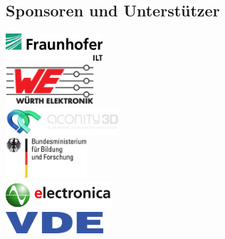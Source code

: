 \documentclass[a4paper,12pt,notumble]{leaflet}
\begin{document}
\noindent
\begin{minipage}[c][0.45\textheight][t]{\textwidth}
	\begin{center}
		\section{Sponsoren und Unterstützer}
		\vspace{1cm}
		\includegraphics[height= 1cm]{../Logos/ILT.png} \\ \vspace{0.3cm}
		\includegraphics[height= 1.5cm]{../Logos/Wuerth.png} \\ \vspace{0.3cm}
		\includegraphics[height= 1cm]{../Logos/aconity.png} \\ \vspace{0.3cm}
		\includegraphics[height= 1.5cm]{../Logos/BMBF.jpg} \\ \vspace{0.3cm}
		\includegraphics[height= 1cm]{../Logos/electronica.png} \\ \vspace{0.3cm}
		\includegraphics[height= 0.8cm]{../Logos/VDE.jpg}
	\end{center}
\end{minipage}
\end{document}
